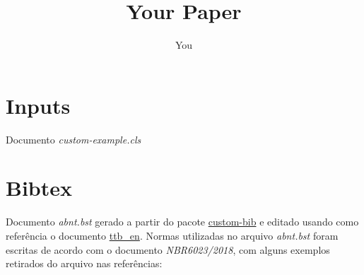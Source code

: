 \documentclass{article}
\title{Your Paper}
\author{You}
\begin{document}
\maketitle
\frenchspacing

\section{Inputs}
Documento \textit{custom-example.cls}

\section{Bibtex}
Documento \textit{abnt.bst} gerado a partir do pacote \href{https://ctan.org/pkg/custom-bib}{custom-bib} e editado usando como referência o documento \href{https://linorg.usp.br/CTAN/info/bibtex/tamethebeast/ttb_en.pdf}{ttb\_en}.
Normas utilizadas no arquivo \textit{abnt.bst} foram escritas de acordo com o documento \textit{NBR6023/2018}, com alguns exemplos retirados do arquivo nas referências: \par
\cite{7.1.1.exemplo1}\cite{7.1.1.exemplo2}\cite{7.1.1.exemplo3}\cite{7.1.2.exemplo1}\cite{7.1.2.exemplo2}\cite{7.1.2.exemplo3}\cite{7.2.exemplo1}\cite{7.2.exemplo2}\cite{7.3.exemplo1}\cite{7.7.exemplo1}\cite{7.7.exemplo2}\cite{7.7.exemplo3}\cite{7.7.exemplo4}\cite{7.7.exemplo5}\cite{7.7.exemplo6}\cite{7.7.exemplo7}\cite{7.7.exemplo8}\cite{7.7.exemplo9}\cite{7.7.exemplo10}\cite{7.7.exemplo11}\cite{7.7.exemplo12}\cite{7.7.exemplo13}\cite{7.7.exemplo14}\cite{7.8.exemplo1}\cite{7.8.exemplo2}



\end{document}
